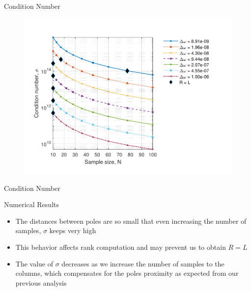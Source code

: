 \documentclass{beamer}
\begin{document}
	\begin{frame}{Condition Number}
        
        \vspace{-20pt}

        \begin{figure}[!ht]
			\centering
			\includegraphics[scale=0.80]{fig/SBRT2021/eigen_hankel-conditionNumber3-2021-05-15.pdf}
		\end{figure}

	\end{frame}
	
	\begin{frame}{Condition Number}
        
        \begin{block}{Numerical Results}
            \begin{itemize}
        	    \item The distances between poles are so small that even increasing the number of samples, $\sigma$ keeps very high
        	    \item This behavior affects rank computation and may prevent us to obtain $R = L$
        	    \item The value of $\sigma$ decreases as we increase the number of samples to the columns, which compensates for the poles proximity as expected from our previous analysis
        	\end{itemize}
        \end{block}
	        
	\end{frame}
\end{document}

